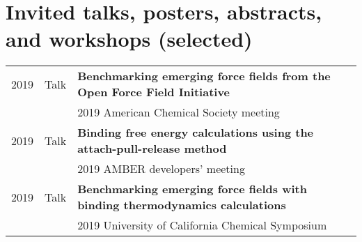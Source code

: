 \documentclass[letterpaper,11pt]{article}
\begin{document}
\section{Invited talks, posters, abstracts, and workshops (selected)}
\begin{tabular}{ll p{14 cm}}
2019 & Talk & \bf{Benchmarking emerging force fields from the Open Force Field Initiative} \\
&& 2019 American Chemical Society meeting \\
2019 & Talk & \bf{Binding free energy calculations using the attach-pull-release method} \\
&& 2019 AMBER developers' meeting \\
2019 & Talk & \bf{Benchmarking emerging force fields with binding thermodynamics calculations} \\
&& 2019 University of California Chemical Symposium \\


\end{tabular}
\end{document}

